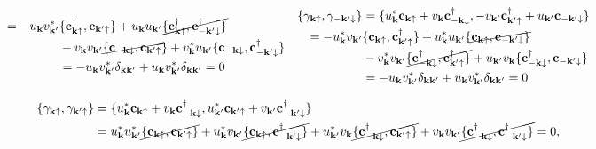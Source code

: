 \documentclass{homework}
\begin{document}
\begin{equation*}
\begin{array}{cc}
\begin{split}
        = -u_{{\bf k}} v_{{\bf k}'}^* & \{{\bf c}_{{\bf k} \uparrow}^\dagger, {\bf c}_{{\bf k}' \uparrow}\} + u_{{\bf k}} u_{{\bf k}'} \cancel{\{{\bf c}_{{\bf k} \uparrow}^\dagger, {\bf c}_{-{\bf k}' \downarrow}^\dagger\}} \\
        &- v_{{\bf k}} v_{{\bf k}'} \cancel{\{{\bf c}_{-{\bf k} \downarrow}, {\bf c}_{{\bf k}' \uparrow}\}} + v_{{\bf k}}^* u_{{\bf k}'} \{{\bf c}_{-{\bf k} \downarrow}, {\bf c}_{-{\bf k}' \downarrow}^\dagger\} \\
        &= -u_{{\bf k}} v_{{\bf k}'}^* \delta_{{\bf k}{\bf k}'} +  u_{{\bf k}} v_{{\bf k}'}^* \delta_{{\bf k}{\bf k}'}= 0 
        \end{split} & \begin{split}
        \{{\gamma}_{{\bf k}\uparrow}, {\gamma}_{-{\bf k}'\downarrow}\} &= \{u_{{\bf k}}^* {\bf c}_{{\bf k}\uparrow} + v_{{\bf k}} {\bf c}_{-{{\bf k}}\downarrow}^\dagger, -v_{{\bf k}'} {\bf c}_{{\bf k}'\uparrow}^\dagger + u_{{\bf k}'} {\bf c}_{-{\bf k}'\downarrow}\} \\
        = -u_{{\bf k}}^* v_{{\bf k}'} &\{{\bf c}_{{\bf k} \uparrow}, {\bf c}_{{\bf k}'\uparrow}^\dagger\} + u_{{\bf k}}^* u_{{\bf k}'} \cancel{\{{\bf c}_{{\bf k} \uparrow}, {\bf c}_{-{\bf k}' \downarrow}\}}\\
        &- v_{{\bf k}}^* v_{{\bf k}'} \cancel{\{{\bf c}_{-{\bf k}\downarrow}^\dagger, {\bf c}_{{\bf k}'\uparrow}^\dagger\}} + u_{{\bf k}'} v_{{\bf k}} \{{\bf c}_{-{\bf k}\downarrow}^\dagger, {\bf c}_{-{\bf k}' \downarrow}\} \\
        &= -u_{{\bf k}} v_{{\bf k}'}^* \delta_{{\bf k}{\bf k}'} +  u_{{\bf k}} v_{{\bf k}'}^* \delta_{{\bf k}{\bf k}'}= 0 
        \end{split}
    \end{array}
\end{equation*}

\begin{equation*}
    \begin{split}
        \{{\gamma}_{{\bf k}\uparrow}, {\gamma}_{{\bf k}'\uparrow}\} &= \{u_{{\bf k}}^* {\bf c}_{{\bf k}\uparrow} + v_{{\bf k}} {\bf c}_{-{{\bf k}}\downarrow}^\dagger, u_{{\bf k}'}^* {\bf c}_{{\bf k}'\uparrow} + v_{{\bf k}'} {\bf c}_{-{{\bf k}'}\downarrow}^\dagger\} \\
        &= u_{{\bf k}}^*u_{{\bf k}'}^* \cancel{\{{\bf c}_{{\bf k} \uparrow}, {\bf c}_{{\bf k}' \uparrow} \}} + u_{{\bf k}}^* v_{{\bf k}'} \cancel{\{{\bf c}_{{\bf k} \uparrow}, {\bf c}_{-{\bf k}' \downarrow}^\dagger\}} + u_{{\bf k}'}^* v_{{\bf k}} \cancel{\{{\bf c}_{-{\bf k} \downarrow}^\dagger,{\bf c}_{{\bf k}' \uparrow}\}} + {v}_{{\bf k}} {v}_{{\bf k}'} \cancel{\{{\bf c}_{-{\bf k} \downarrow}^\dagger, {\bf c}_{-{\bf k}' \downarrow}^\dagger\}} = 0,
                \end{split}
\end{equation*}
\end{document}
